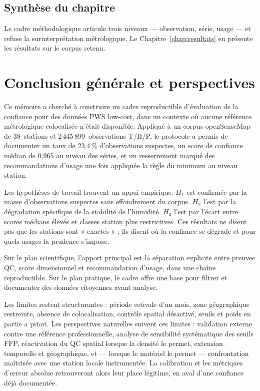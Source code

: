 \documentclass[12pt,a4paper]{report}
\begin{document}
\section{Synthèse du chapitre}

Le cadre méthodologique articule trois niveaux --- observation, série, usage ---
et refuse la surinterprétation métrologique. Le Chapitre~\ref{chap:resultats}
en présente les résultats sur le corpus retenu.



\chapter*{Conclusion générale et perspectives}
\label{chap:conclusion}

Ce mémoire a cherché à construire un cadre reproductible d'évaluation de la
confiance pour des données PWS low-cost, dans un contexte où aucune référence
métrologique colocalisée n'était disponible. Appliqué à un corpus openSenseMap
de 38~stations et 2\,445\,899~observations T/H/P, le protocole a permis de
documenter un taux de 23,4\,\% d'observations suspectes, un score de confiance
médian de 0,965 au niveau des séries, et un resserrement marqué des
recommandations d'usage une fois appliquée la règle du minimum au niveau
station.

Les hypothèses de travail trouvent un appui empirique. $H_1$ est confirmée par
la masse d'observations suspectes sans effondrement du corpus. $H_2$ l'est par
la dégradation spécifique de la stabilité de l'humidité. $H_3$ l'est par l'écart
entre scores médians élevés et classes station plus restrictives. Ces résultats
ne disent pas que les stations sont « exactes » ; ils disent où la confiance
se dégrade et pour quels usages la prudence s'impose.

Sur le plan scientifique, l'apport principal est la séparation explicite entre
preuves QC, score dimensionnel et recommandation d'usage, dans une chaîne
reproductible. Sur le plan pratique, le cadre offre une base pour filtrer et
documenter des données citoyennes avant analyse.

Les limites restent structurantes : période estivale d'un mois, zone
géographique restreinte, absence de colocalisation, contrôle spatial
désactivé, seuils et poids en partie a priori. Les perspectives naturelles
suivent ces limites : validation externe contre une référence professionnelle,
analyse de sensibilité systématique des seuils FFP, réactivation du QC
spatial lorsque la densité le permet, extension temporelle et géographique, et
--- lorsque le matériel le permet --- confrontation maîtrisée avec une station
locale instrumentée. La calibration et les métriques d'erreur absolue
retrouveront alors leur place légitime, en aval d'une confiance déjà
documentée.
\end{document}
